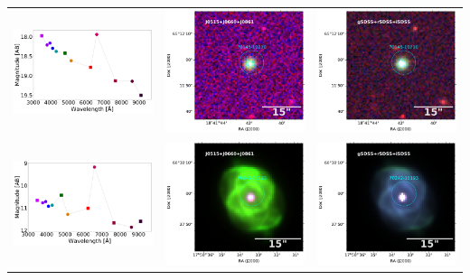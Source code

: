 \begin{table}
\begin{tabular}{ccc}
\includegraphics[width=0.3\linewidth, clip]{figs-pca/photospectrum_64343-69243-Missing-pne-allinf-v2_MAG_APER_6_0.pdf} & \includegraphics[width=0.3\linewidth, clip]{Field_70145/1000001-JPLUS-02985-v202006_J0861_70145-19210-RGB.pdf} & \includegraphics[width=0.3\linewidth, clip]{Field_70145/1000001-JPLUS-02985-v202006_iSDSS_70145-19210-RGB.pdf} \\
\includegraphics[width=0.3\linewidth, clip]{figs-pca/photospectrum_70242-18193-Missing-pne-allinf-v2_MAG_APER_6_0.pdf} & \includegraphics[width=0.3\linewidth, clip]{Field_70242/1000001-JPLUS-03035-v202006_J0861_70242-18193-RGB.pdf} & \includegraphics[width=0.3\linewidth, clip]{Field_70242/1000001-JPLUS-03035-v202006_iSDSS_70242-18193-RGB.pdf} \\
\end{tabular}
\end{table}
